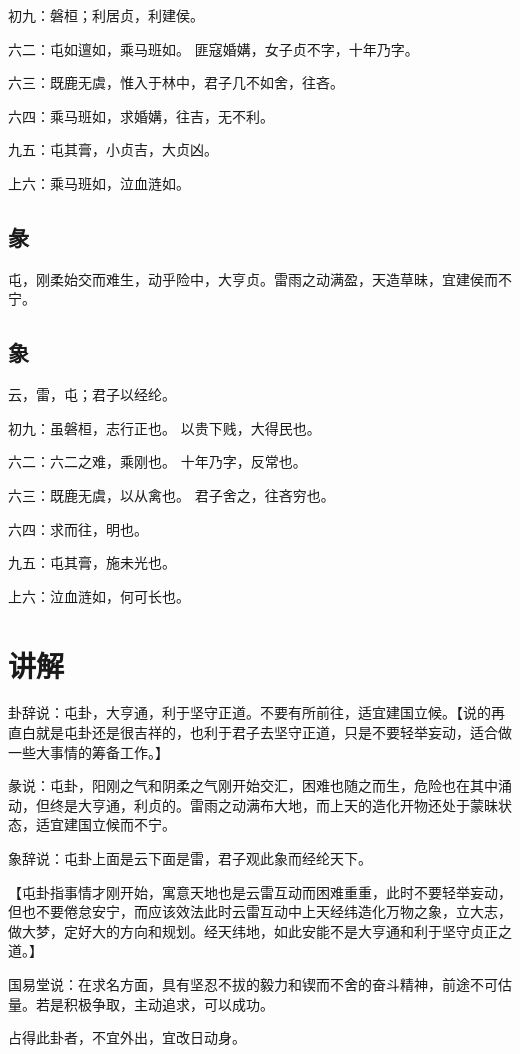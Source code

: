 \documentclass[12pt,oneside]{book}
\begin{document}
初九：磐桓；利居贞，利建侯。

六二：屯如邅如，乘马班如。 匪寇婚媾，女子贞不字，十年乃字。

六三：既鹿无虞，惟入于林中，君子几不如舍，往吝。

六四：乘马班如，求婚媾，往吉，无不利。

九五：屯其膏，小贞吉，大贞凶。

上六：乘马班如，泣血涟如。

\subsection{彖}
屯，刚柔始交而难生，动乎险中，大亨贞。雷雨之动满盈，天造草昧，宜建侯而不宁。

\subsection{象}
云，雷，屯；君子以经纶。

初九：虽磐桓，志行正也。 以贵下贱，大得民也。

六二：六二之难，乘刚也。 十年乃字，反常也。

六三：既鹿无虞，以从禽也。 君子舍之，往吝穷也。

六四：求而往，明也。

九五：屯其膏，施未光也。

上六：泣血涟如，何可长也。

\section{讲解}
卦辞说：屯卦，大亨通，利于坚守正道。不要有所前往，适宜建国立候。【说的再直白就是屯卦还是很吉祥的，也利于君子去坚守正道，只是不要轻举妄动，适合做一些大事情的筹备工作。】

彖说：屯卦，阳刚之气和阴柔之气刚开始交汇，困难也随之而生，危险也在其中涌动，但终是大亨通，利贞的。雷雨之动满布大地，而上天的造化开物还处于蒙昧状态，适宜建国立候而不宁。

象辞说：屯卦上面是云下面是雷，君子观此象而经纶天下。

【屯卦指事情才刚开始，寓意天地也是云雷互动而困难重重，此时不要轻举妄动，但也不要倦怠安宁，而应该效法此时云雷互动中上天经纬造化万物之象，立大志，做大梦，定好大的方向和规划。经天纬地，如此安能不是大亨通和利于坚守贞正之道。】


国易堂说：在求名方面，具有坚忍不拔的毅力和锲而不舍的奋斗精神，前途不可估量。若是积极争取，主动追求，可以成功。

占得此卦者，不宜外出，宜改日动身。
\end{document}
